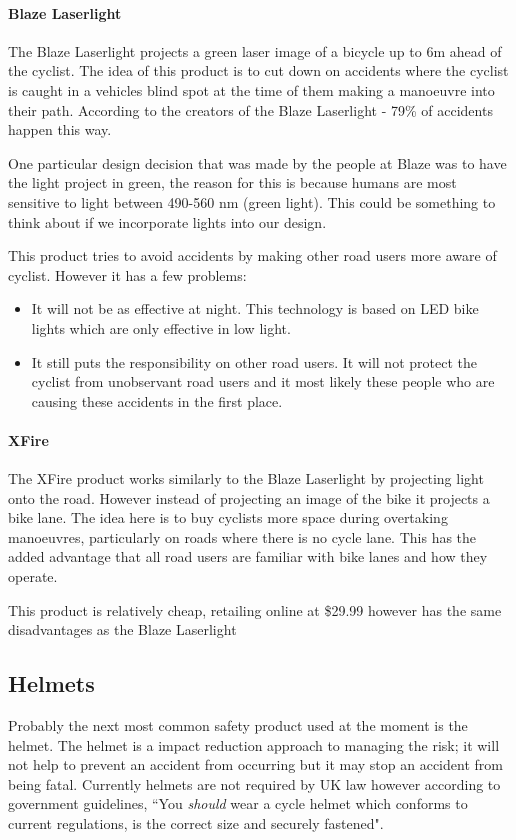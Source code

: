 \documentclass[a4paper]{report}
\begin{document}
\paragraph{Blaze Laserlight}
The Blaze Laserlight\cite{laserlight} projects a green laser image of a bicycle up to 6m ahead of the cyclist. The idea of this product is to cut down on accidents where the cyclist is caught in a vehicles blind spot at the time of them making a manoeuvre into their path. According to the creators of the Blaze Laserlight - 79\% of accidents happen this way. 

One particular design decision that was made by the people at Blaze was to have the light project in green, the reason for this is because humans are most sensitive to light between 490-560 nm (green light). This could be something to think about if we incorporate lights into our design.

This product tries to avoid accidents by making other road users more aware of cyclist. However it has a few problems:
\begin{itemize}
\item It will not be as effective at night. This technology is based on LED bike lights which are only effective in low light.
\item It still puts the responsibility on other road users. It will not protect the cyclist from unobservant road users and it most likely these people who are causing these accidents in the first place.
\end{itemize}

\paragraph{XFire}
The XFire\cite{xfire} product works similarly to the Blaze Laserlight by projecting light onto the road. However instead of projecting an image of the bike it projects a bike lane. The idea here is to buy cyclists more space during overtaking manoeuvres, particularly on roads where there is no cycle lane. This has the added advantage that all road users are familiar with bike lanes and how they operate. 

This product is relatively cheap, retailing online at \$29.99 however has the same disadvantages as the Blaze Laserlight

\subsection{Helmets}
Probably the next most common safety product used at the moment is the helmet. The helmet is a impact reduction approach to managing the risk; it will not help to prevent an accident from occurring but it may stop an accident from being fatal. Currently helmets are not required by UK law however according to government guidelines, ``You \textit{should} wear a cycle helmet which conforms to current regulations, is the correct size and securely fastened"\cite{helmet_gov}.
\end{document}

